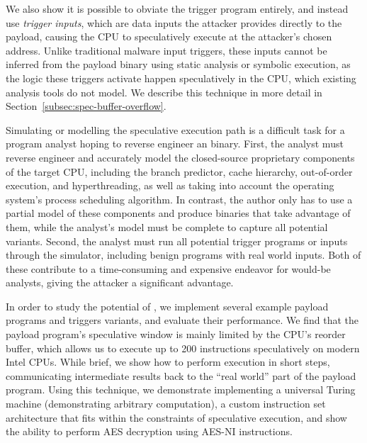 
We also show it is possible to obviate the trigger program entirely, and
instead use \emph{trigger inputs}, which are data inputs the attacker provides
directly to
the payload, causing the CPU to speculatively execute
at the attacker's chosen address. Unlike traditional malware input triggers, these inputs
cannot be inferred from the payload binary using static analysis or symbolic
execution, as the logic these triggers activate happen speculatively in the
CPU, which existing analysis tools do not model. We describe this technique in
more detail in Section~\ref{subsec:spec-buffer-overflow}.

Simulating or modelling the speculative execution path is a difficult task for a
program analyst hoping to reverse engineer an \speculake binary. First, the
analyst must reverse engineer and accurately model the closed-source proprietary
components of the target CPU, including the branch predictor, cache hierarchy,
out-of-order execution, and hyperthreading, as well as taking into account the
operating system's process scheduling algorithm. In contrast, the \speculake
author only has to use a partial model of these components and produce binaries
that take advantage of them, while the analyst's model must be complete to
capture all potential \speculake variants. Second, the analyst must run all
potential trigger programs or inputs through the simulator, including benign
programs with real world inputs. Both of these contribute to a time-consuming and expensive
endeavor for would-be analysts, giving the attacker a significant advantage.

In order to study the potential of \speculake, we implement several example
payload programs and triggers variants, and evaluate their performance. We find
that the payload program's speculative
window is mainly limited by the CPU's reorder buffer, which
allows us to execute up to 200 instructions speculatively on modern
Intel CPUs. While brief, we show how to perform execution in short steps,
communicating intermediate results back to the ``real world'' part of the
payload program. Using this technique, we demonstrate implementing a universal
Turing machine (demonstrating arbitrary computation), a custom instruction set
architecture that fits within the constraints of speculative execution, and show
the ability to perform AES decryption using AES-NI instructions.

